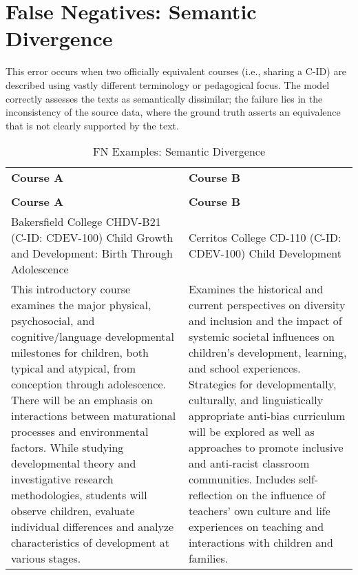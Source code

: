 \section{False Negatives: Semantic Divergence}\label{app:semdiv}
This error occurs when two officially equivalent courses (i.e., sharing a C-ID) are described using vastly different terminology or pedagogical focus. The model correctly assesses the texts as semantically dissimilar; the failure lies in the inconsistency of the source data, where the ground truth asserts an equivalence that is not clearly supported by the text.

\begin{longtable}{ >{\baselineskip=12pt}p{}  >{\baselineskip=12pt}p{} }
\captionsetup{skip=5pt}
\caption{FN Examples: Semantic Divergence}\label{tab:fn_divergence}\\
\bottomrule\toprule
\textbf{\textbf{Course A}} & \textbf{Course B} \\
\bottomrule\toprule
\endfirsthead
\caption[]{FN Examples: Semantic Divergence}\\
\bottomrule\toprule
\textbf{\textbf{Course A}} & \textbf{Course B} \\
\bottomrule\toprule
\endhead
Bakersfield College \newline CHDV-B21 (C-ID: CDEV-100) \newline Child Growth and Development: Birth Through Adolescence & Cerritos College \newline CD-110 (C-ID: CDEV-100) \newline Child Development \\
\midrule
This introductory course examines the major physical, psychosocial, and cognitive/language developmental milestones for children, both typical and atypical, from conception through adolescence. There will be an emphasis on interactions between maturational processes and environmental factors. While studying developmental theory and investigative research methodologies, students will observe children, evaluate individual differences and analyze characteristics of development at various stages. & Examines the historical and current perspectives on diversity and inclusion and the impact of systemic societal influences on children’s development, learning, and school experiences. Strategies for developmentally, culturally, and linguistically appropriate anti-bias curriculum will be explored as well as approaches to promote inclusive and anti-racist classroom communities. Includes self-reflection on the influence of teachers’ own culture and life experiences on teaching and interactions with children and families. \\

\end{longtable}
